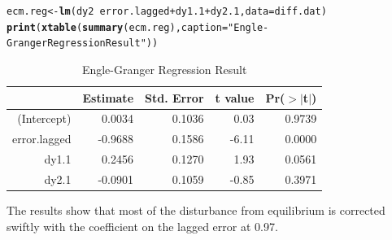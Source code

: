 \documentclass{article}\usepackage{graphicx, color}
\makeatletter
\newcommand{\hlfunctioncall}[1]{\textcolor[rgb]{0.501960784313725,0,0.329411764705882}{\textbf{#1}}}%
\newcommand{\hlstring}[1]{\textcolor[rgb]{0.6,0.6,1}{#1}}%
\newenvironment{kframe}{%
 \def\at@end@of@kframe{}%
 \ifinner\ifhmode%
  \def\at@end@of@kframe{\end{minipage}}%
  \begin{minipage}{\columnwidth}%
 \fi\fi%
 \def\FrameCommand##1{\hskip\@totalleftmargin \hskip-\fboxsep
 \colorbox{shadecolor}{##1}\hskip-\fboxsep
     \hskip-\linewidth \hskip-\@totalleftmargin \hskip\columnwidth}%
 \MakeFramed {\advance\hsize-\width
   \@totalleftmargin\z@ \linewidth\hsize
   \@setminipage}}%
 {\par\unskip\endMakeFramed%
 \at@end@of@kframe}
\makeatother
\begin{document}
\begin{kframe}
\begin{alltt}
ecm.reg <- \hlfunctioncall{lm}(dy2 ~ error.lagged + dy1.1 + dy2.1, data = diff.dat)
\hlfunctioncall{print}(\hlfunctioncall{xtable}(\hlfunctioncall{summary}(ecm.reg), caption = \hlstring{"Engle-Granger Regression Result"}))
\end{alltt}
\end{kframe}%
\begin{table}[ht]
\begin{center}
\begin{tabular}{rrrrr}
  \hline
 & Estimate & Std. Error & t value & Pr($>$$|$t$|$) \\ 
  \hline
(Intercept) & 0.0034 & 0.1036 & 0.03 & 0.9739 \\ 
  error.lagged & -0.9688 & 0.1586 & -6.11 & 0.0000 \\ 
  dy1.1 & 0.2456 & 0.1270 & 1.93 & 0.0561 \\ 
  dy2.1 & -0.0901 & 0.1059 & -0.85 & 0.3971 \\ 
   \hline
\end{tabular}
\caption{Engle-Granger Regression Result}
\end{center}
\end{table}


The results show that most of the disturbance from equilibrium is corrected swiftly with the coefficient on the lagged error at 0.97. 



\newpage


\end{document}
